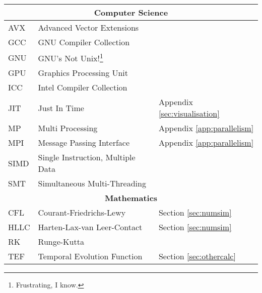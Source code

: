 \begin{abbreviations}
\begin{longtable}[c]{lll}
  \hline
  \multicolumn{3}{c}{\textbf{Computer Science}} \\
  \hline

  AVX  & Advanced Vector Extensions & \\
  GCC  & GNU Compiler Collection & \\
  GNU  & GNU's Not Unix!\footnote{Frustrating, I know.} & \\
  GPU  & Graphics Processing Unit & \\
  ICC  & Intel Compiler Collection & \\
  JIT  & Just In Time & Appendix \ref{sec:visualisation} \\
  MP   & Multi Processing & Appendix \ref{app:parallelism} \\
  MPI  & Message Passing Interface & Appendix \ref{app:parallelism} \\
  SIMD & Single Instruction, Multiple Data & \\
  SMT  & Simultaneous Multi-Threading & \\

  \hline
  \multicolumn{3}{c}{\textbf{Mathematics}} \\
  \hline

  CFL  & Courant-Friedrichs-Lewy & Section \ref{sec:numsim} \\
  HLLC & Harten-Lax-van Leer-Contact & Section \ref{sec:numsim} \\
  RK   & Runge-Kutta & \\
  TEF & Temporal Evolution Function & Section \ref{sec:othercalc} \\

\end{longtable}
\end{abbreviations}
